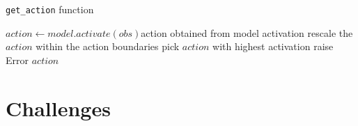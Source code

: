 \begin{algorithm}
\caption{\texttt{get\_action} function}
\label{algo:pseudo_get_action_function}
\begin{algorithmic}
\State $action \gets model.activate(obs)$\Comment action obtained from model activation
    \State rescale the $action$ within the action boundaries
    \State pick $action$ with highest activation
\Else
    \State raise Error
\EndIf
\Return $action$
\EndFunction
\end{algorithmic}
\end{algorithm}

\section{Challenges}

